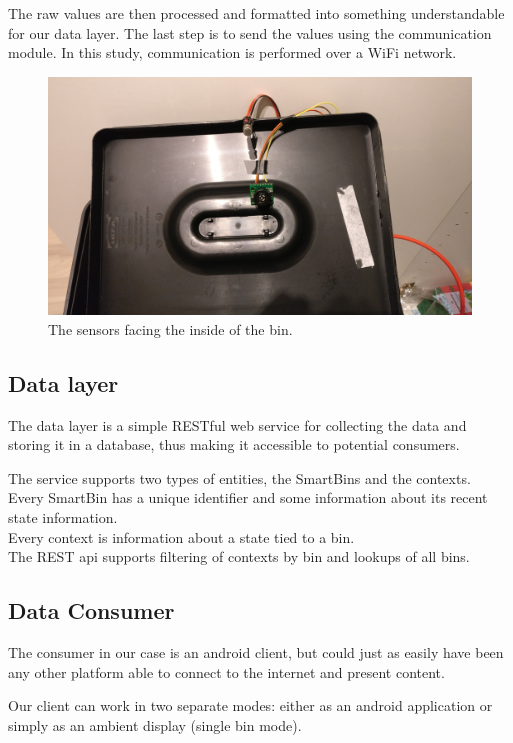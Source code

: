 The raw values are then processed and formatted into something understandable for our data layer.
The last step is to send the values using the communication module.
In this study, communication is performed over a WiFi network.

\begin{figure}
\centering
\includegraphics[scale=.05]{img/IMG_20161130_163302}
\caption{The sensors facing the inside of the bin.}
\label{fig:sensors}
\end{figure}

\subsection{Data layer}
The data layer is a simple RESTful web service for collecting the data and storing it in a database, thus making it accessible to potential consumers.

The service supports two types of entities, the SmartBins and the contexts.\\
Every SmartBin has a unique identifier and some information about its recent state information.\\
Every context is information about a state tied to a bin.\\
The REST api supports filtering of contexts by bin and lookups of all bins.

\subsection{Data Consumer}
The consumer in our case is an android client, but could just as easily have been any other platform able to connect to the internet and present content.

Our client can work in two separate modes: either as an android application or simply as an ambient display (single bin mode).

